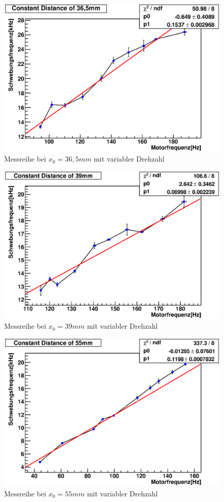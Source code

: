 \documentclass[12pt]{article}
\begin{document}
\begin{figure}[H]  
\centering
\includegraphics[width=0.7\linewidth]{pictures/36,5mm1.eps}
\caption{Messreihe bei $x_0 = 36,5mm$ mit variabler Drehzahl}
\label{36mm}
\end{figure}

\begin{figure}[H]  
\centering
\includegraphics[width=0.7\linewidth]{pictures/39mm1.eps}
\caption{Messreihe bei $x_0 = 39mm$ mit variabler Drehzahl}
\label{39mmm}
\end{figure}

\begin{figure}[H]  
\centering
\includegraphics[width=0.7\linewidth]{pictures/55mm1.eps}
\caption{Messreihe bei $x_0 = 55mm$ mit variabler Drehzahl}
\label{55mm}
\end{figure}
\end{document}
